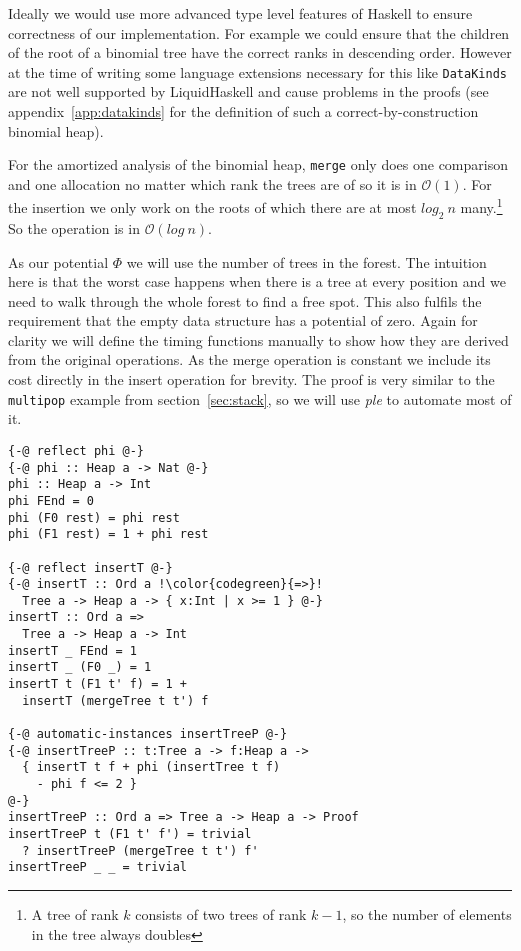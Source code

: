 \documentclass[sigplan,screen]{acmart}
\renewcommand\O[1]{$\mathcal{O}(#1)$}
\begin{document}
Ideally we would use more advanced type level features of Haskell to ensure correctness of our implementation. For example we could ensure that the children of the root of a binomial tree have the correct ranks in descending order. However at the time of writing some language extensions necessary for this like \texttt{DataKinds} are not well supported by LiquidHaskell and cause problems in the proofs (see appendix~\ref{app:datakinds} for the definition of such a correct-by-construction binomial heap).

For the amortized analysis of the binomial heap, \texttt{merge} only does one comparison and one allocation no matter which rank the trees are of so it is in \O{1}. For the insertion we only work on the roots of which there are at most $log_2 \: n$ many.\footnote{A tree of rank $k$ consists of two trees of rank $k - 1$, so the number of elements in the tree always doubles} So the operation is in \O{log \: n}.

As our potential $\Phi$ we will use the number of trees in the forest. The intuition here is that the worst case happens when there is a tree at every position and we need to walk through the whole forest to find a free spot. This also fulfils the requirement that the empty data structure has a potential of zero. Again for clarity we will define the timing functions manually to show how they are derived from the original operations. As the merge operation is constant we include its cost directly in the insert operation for brevity. The proof is very similar to the \texttt{multipop} example from section~\ref{sec:stack}, so we will use \textit{ple} to automate most of it.

\begin{lstlisting}[escapechar=!]
{-@ reflect phi @-}
{-@ phi :: Heap a -> Nat @-}
phi :: Heap a -> Int
phi FEnd = 0
phi (F0 rest) = phi rest
phi (F1 rest) = 1 + phi rest

{-@ reflect insertT @-}
{-@ insertT :: Ord a !\color{codegreen}{=>}!
  Tree a -> Heap a -> { x:Int | x >= 1 } @-}
insertT :: Ord a =>
  Tree a -> Heap a -> Int
insertT _ FEnd = 1
insertT _ (F0 _) = 1
insertT t (F1 t' f) = 1 +
  insertT (mergeTree t t') f

{-@ automatic-instances insertTreeP @-}
{-@ insertTreeP :: t:Tree a -> f:Heap a ->
  { insertT t f + phi (insertTree t f)
    - phi f <= 2 }
@-}
insertTreeP :: Ord a => Tree a -> Heap a -> Proof
insertTreeP t (F1 t' f') = trivial
  ? insertTreeP (mergeTree t t') f'
insertTreeP _ _ = trivial
\end{lstlisting}
\end{document}
